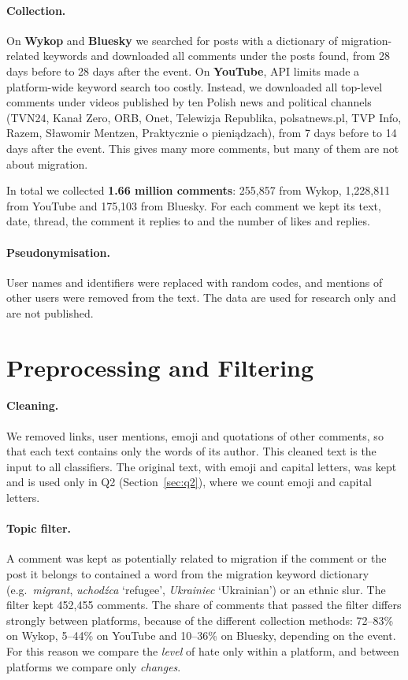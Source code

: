 \documentclass[11pt]{article}
\begin{document}
\paragraph{Collection.} On \textbf{Wykop} and \textbf{Bluesky} we searched for posts with a dictionary of migration-related keywords and downloaded all comments under the posts found, from 28 days before to 28 days after the event. On \textbf{YouTube}, API limits made a platform-wide keyword search too costly. Instead, we downloaded all top-level comments under videos published by ten Polish news and political channels (TVN24, Kanał Zero, ORB, Onet, Telewizja Republika, polsatnews.pl, TVP Info, Razem, Sławomir Mentzen, Praktycznie o pieniądzach), from 7 days before to 14 days after the event. This gives many more comments, but many of them are not about migration.

In total we collected \textbf{1.66 million comments}: 255,857 from Wykop, 1,228,811 from YouTube and 175,103 from Bluesky. For each comment we kept its text, date, thread, the comment it replies to and the number of likes and replies.

\paragraph{Pseudonymisation.} User names and identifiers were replaced with random codes, and mentions of other users were removed from the text. The data are used for research only and are not published.

\section{Preprocessing and Filtering}

\paragraph{Cleaning.} We removed links, user mentions, emoji and quotations of other comments, so that each text contains only the words of its author. This cleaned text is the input to all classifiers. The original text, with emoji and capital letters, was kept and is used only in Q2 (Section~\ref{sec:q2}), where we count emoji and capital letters.

\paragraph{Topic filter.} A comment was kept as potentially related to migration if the comment or the post it belongs to contained a word from the migration keyword dictionary (e.g.\ \textit{migrant}, \textit{uchodźca} `refugee', \textit{Ukrainiec} `Ukrainian') or an ethnic slur. The filter kept 452,455 comments. The share of comments that passed the filter differs strongly between platforms, because of the different collection methods: 72--83\% on Wykop, 5--44\% on YouTube and 10--36\% on Bluesky, depending on the event. For this reason we compare the \emph{level} of hate only within a platform, and between platforms we compare only \emph{changes}.
\end{document}
